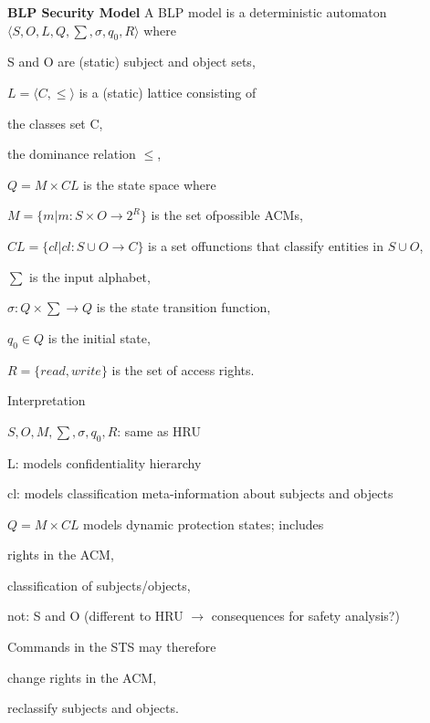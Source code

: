 \documentclass[a4paper]{article}
\renewcommand{\note}[2]{\begin{noteBox} \textbf{#1} #2 \end{noteBox}}
\begin{document}
\begin{multicols}{3}
    \note{BLP Security Model}{A BLP model is a deterministic automaton $⟨S,O,L,Q,\sum,\sigma,q_0,R⟩$ where
        \begin{itemize*}
            \item S and O are (static) subject and object sets,
            \item $L=⟨C,\leq⟩$ is a (static) lattice consisting of
            \begin{itemize*}
                \item the classes set C,
                \item the dominance relation $\leq$,
            \end{itemize*}
            \item $Q=M\times CL$ is the state space where
            \begin{itemize*}
                \item $M=\{m|m:S\times O\rightarrow 2^R\}$ is the set ofpossible ACMs,
                \item $CL=\{cl|cl:S\cup O\rightarrow C\}$ is a set offunctions that classify entities in $S\cup O$,
            \end{itemize*}
            \item $\sum$ is the input alphabet,
            \item $\sigma:Q\times \sum\rightarrow Q$ is the state transition function,
            \item $q_0\in Q$ is the initial state,
            \item $R=\{read,write\}$ is the set of access rights.
        \end{itemize*}
    }

    Interpretation
    \begin{itemize*}
        \item $S,O,M,\sum,\sigma,q_0,R$: same as HRU
        \item L: models confidentiality hierarchy
        \item cl: models classification meta-information about subjects and objects
        \item $Q=M\times CL$ models dynamic protection states; includes
        \begin{itemize*}
            \item rights in the ACM,
            \item classification of subjects/objects,
            \item not: S and O (different to HRU $\rightarrow$ consequences for safety analysis?)
        \end{itemize*}
        \item Commands in the STS may therefore
        \begin{itemize*}
            \item change rights in the ACM,
            \item reclassify subjects and objects.
        \end{itemize*}
    \end{itemize*}


\end{multicols}
\end{document}

